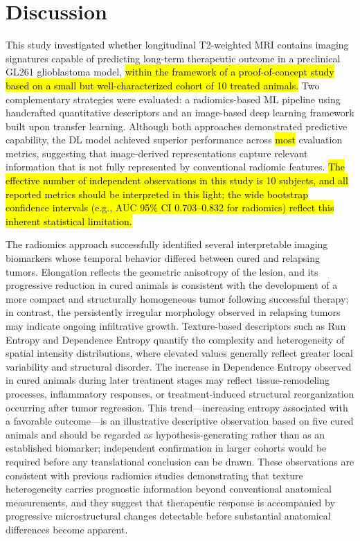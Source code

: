 \documentclass{article}
\begin{document}
\section{Discussion}
This study investigated whether longitudinal T2-weighted MRI contains imaging signatures capable of predicting long-term therapeutic outcome in a preclinical GL261 glioblastoma model, \hl{within the framework of a proof-of-concept study based on a small but well-characterized cohort of 10 treated animals.} Two complementary strategies were evaluated: a radiomics-based ML pipeline using handcrafted quantitative descriptors and an image-based deep learning framework built upon transfer learning. Although both approaches demonstrated predictive capability, the DL model achieved superior performance across \hl{most} evaluation metrics, suggesting that image-derived representations capture relevant information that is not fully represented by conventional radiomic features. \hl{The effective number of independent observations in this study is 10 subjects, and all reported metrics should be interpreted in this light; the wide bootstrap confidence intervals (e.g., AUC 95\% CI 0.703--0.832 for radiomics) reflect this inherent statistical limitation.}

The radiomics approach successfully identified several interpretable imaging biomarkers whose temporal behavior differed between cured and relapsing tumors. Elongation reflects the geometric anisotropy of the lesion, and its progressive reduction in cured animals is consistent with the development of a more compact and structurally homogeneous tumor following successful therapy; in contrast, the persistently irregular morphology observed in relapsing tumors may indicate ongoing infiltrative growth. Texture-based descriptors such as Run Entropy and Dependence Entropy quantify the complexity and heterogeneity of spatial intensity distributions, where elevated values generally reflect greater local variability and structural disorder. The increase in Dependence Entropy observed in cured animals during later treatment stages may reflect tissue-remodeling processes, inflammatory responses, or treatment-induced structural reorganization occurring after tumor regression. This trend---increasing entropy associated with a favorable outcome---is an illustrative descriptive observation based on five cured animals and should be regarded as hypothesis-generating rather than as an established biomarker; independent confirmation in larger cohorts would be required before any translational conclusion can be drawn. These observations are consistent with previous radiomics studies demonstrating that texture heterogeneity carries prognostic information beyond conventional anatomical measurements, and they suggest that therapeutic response is accompanied by progressive microstructural changes detectable before substantial anatomical differences become apparent.
\end{document}
